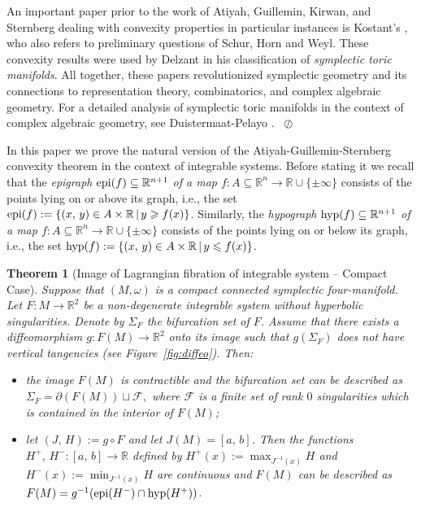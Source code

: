 \documentclass[11pt]{article}
\newtheorem{nostheorem}{Theorem}
\newcommand{\R}{{\mathbb R}}
\newcommand{\op}[1]{\!\!\mathop{\rm ~#1}\nolimits}
\newenvironment{remark}{\refstepcounter{theorem}\par\medskip\noindent{\bf
Remark~\thetheorem~~}}{\unskip\nobreak\hfill\hbox{ $\oslash$}\par\bigskip}
\renewcommand{\geq}{\geqslant}
\renewcommand{\leq}{\leqslant}
\begin{document}
\begin{remark}
  An important paper prior to the work of Atiyah, Guillemin, Kirwan,
  and Sternberg dealing with convexity properties in particular
  instances is Kostant's \cite{Ko1974}, who also refers to preliminary
  questions of Schur, Horn and Weyl.  These convexity results were
  used by Delzant \cite{Delzant1988} in his classification of
  \emph{symplectic toric manifolds}.  All together, these papers
  revolutionized symplectic geometry and its connections to
  representation theory, combinatorics, and complex algebraic
  geometry.  For a detailed analysis of symplectic toric manifolds in
  the context of complex algebraic geometry, see Duistermaat-Pelayo
  \cite{DuPe2009}.
\end{remark}



In this paper we prove the natural version of the
Atiyah\--Guillemin\--Sternberg convexity theorem in the context of
integrable systems.  Before stating it we recall that the
\emph{epigraph $\op{epi}(f) \subseteq \mathbb{R}^{n+1}$ of a map $f
  \colon A \subseteq \mathbb{R}^n \to \mathbb{R} \cup \{\pm\infty\}$}
consists of the points lying on or above its graph, i.e., the set
$\op{epi}(f):= \{ (x,\, y) \in A \times \mathbb{R} \, | \, y \geq
f(x)\}$. Similarly, the \emph{hypograph $\op{hyp}(f)
  \subseteq\mathbb{R}^{n+1}$ of a map $f \colon A \subseteq
  \mathbb{R}^n \to\mathbb{R} \cup \{\pm \infty\}$} consists of the
points lying on or below its graph, i.e., the set $ \op{hyp}(f):= \{
(x,\, y) \in A \times\mathbb{R} \, | \, y \leq f(x) \}$.

\begin{nostheorem}[Image of Lagrangian fibration of integrable system
  -- Compact Case]
  \label{theo:main-image0}
  Suppose that $(M, \omega)$ is a compact connected symplectic
  four-manifold. Let $F \colon M \to \mathbb{R}^2$ be a non-degenerate
  integrable system without hyperbolic singularities. Denote by
  $\Sigma_F$ the bifurcation set of $F$.  Assume that there exists a
  diffeomorphism $g \colon F(M) \to \mathbb{R}^2$ onto its image such
  that $g(\Sigma_F)$ does not have vertical tangencies (see
  Figure~\ref{fig:diffeo}). Then:
  \begin{itemize}
  \item[{\rm (1)}] the image $F(M)$ is contractible and  the bifurcation
set can be described as
  $ \Sigma_F=\partial  (F(M)) \sqcup \mathcal{F}, $ where $\mathcal{F}$ is
a finite set
    of rank $0$ singularities which is contained in the interior of
    $F(M)$;
  \item[{\rm (2)}]
  let $(J,\,H):=g\circ F$ and let $J(M)=[a,\,b]$. Then  the functions
$H^{+},\,
    H^{-} \colon [a,\,b]  \to \R$ defined by $H^{+}(x) := \max_{J^{-1}(x)}
    H$ and $H^{-}(x) := \min_{J^{-1}(x)} H$ are continuous and $F(M)$
    can be described as $F(M) = g^{-1}(\op{epi}(H^{-}) \cap
    \op{hyp}(H^+))$.
\end{itemize}
\end{nostheorem}
\end{document}
